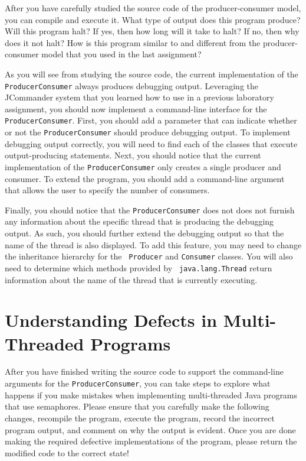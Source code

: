 After you have carefully studied the source code of the producer-consumer model, you can compile and execute it.  What
type of output does this program produce?  Will this program halt?  If yes, then how long will it take to halt?  If no,
then why does it not halt? How is this program similar to and different from the producer-consumer model that you used
in the last assignment?

\begin{sloppypar} 
  As you will see from studying the source code, the current implementation of the {\tt
    ProducerConsumer} always produces debugging output. Leveraging the JCommander system that you learned how to use in
  a previous laboratory assignment, you should now implement a command-line interface for the {\tt ProducerConsumer}.
  First, you should add a parameter that can indicate whether or not the {\tt ProducerConsumer} should produce debugging
  output.  To implement debugging output correctly, you will need to find each of the classes that execute
  output-producing statements.  Next, you should notice that the current implementation of the {\tt ProducerConsumer}
  only creates a single producer and consumer.  To extend the program, you should add a command-line argument that
  allows the user to specify the number of consumers.  
\end{sloppypar}

Finally, you should notice that the {\tt ProducerConsumer} does not does not furnish any information about the specific
thread that is producing the debugging output.  As such, you should further extend the debugging output so that the name
of the thread is also displayed. To add this feature, you may need to change the inheritance hierarchy for the {\tt
  Producer} and {\tt Consumer} classes.  You will also need to determine which methods provided by {\tt
  java.lang.Thread} return information about the name of the thread that is currently executing.

\section*{Understanding Defects in Multi-Threaded Programs}

After you have finished writing the source code to support the command-line arguments for the {\tt ProducerConsumer},
you can take steps to explore what happens if you make mistakes when implementing multi-threaded Java programs that use
semaphores.  Please ensure that you carefully make the following changes, recompile the program, execute the program,
record the incorrect program output, and comment on why the output is evident.  Once you are done making the required
defective implementations of the program, please return the modified code to the correct state!

